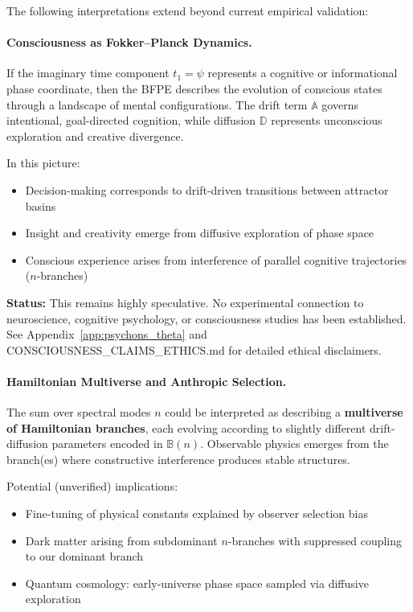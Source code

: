 \begin{center}
\end{center}

The following interpretations extend beyond current empirical validation:

\paragraph{Consciousness as Fokker--Planck Dynamics.}
If the imaginary time component $t_1 = \psi$ represents a cognitive or informational phase coordinate, then the BFPE describes the evolution of conscious states through a landscape of mental configurations. The drift term $\mathbb{A}$ governs intentional, goal-directed cognition, while diffusion $\mathbb{D}$ represents unconscious exploration and creative divergence.

In this picture:
\begin{itemize}
\item Decision-making corresponds to drift-driven transitions between attractor basins
\item Insight and creativity emerge from diffusive exploration of phase space
\item Conscious experience arises from interference of parallel cognitive trajectories ($n$-branches)
\end{itemize}

\textbf{Status:} This remains highly speculative. No experimental connection to neuroscience, cognitive psychology, or consciousness studies has been established. See Appendix~\ref{app:psychons_theta} and CONSCIOUSNESS\_CLAIMS\_ETHICS.md for detailed ethical disclaimers.

\paragraph{Hamiltonian Multiverse and Anthropic Selection.}
The sum over spectral modes $n$ could be interpreted as describing a \textbf{multiverse of Hamiltonian branches}, each evolving according to slightly different drift-diffusion parameters encoded in $\mathbb{B}(n)$. Observable physics emerges from the branch(es) where constructive interference produces stable structures.

Potential (unverified) implications:
\begin{itemize}
\item Fine-tuning of physical constants explained by observer selection bias
\item Dark matter arising from subdominant $n$-branches with suppressed coupling to our dominant branch
\item Quantum cosmology: early-universe phase space sampled via diffusive exploration
\end{itemize}

